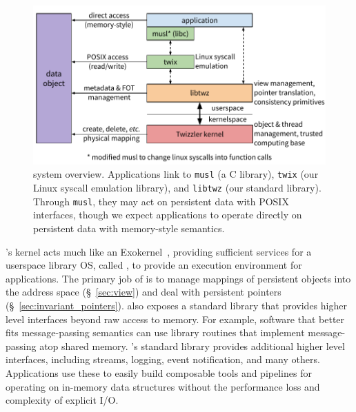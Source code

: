 {    \begin{figure}
        \centering
        \includegraphics[width=\textwidth]{fig/sys_diag}
        \caption{\Twizzler system overview. Applications link to \texttt{musl} (a C library),
            \texttt{twix} (our Linux syscall emulation library), and \texttt{libtwz} (our standard
            library). Through \texttt{musl}, they may act on persistent data with POSIX interfaces,
            though we expect \Twizzler applications to operate directly on persistent data with
            memory-style semantics.}
        \label{fig:twz_sys_overview}
    \end{figure}


    \Twizzler's kernel acts much like an
    Exokernel~\cite{Kaashoek,engler:sosp95}, providing sufficient services for a
    userspace library OS, called \emph{\libcore}, to provide an execution environment for applications.
    The primary job of \libcore is to manage mappings of persistent objects into the address space (\S~\ref{sec:view})
    and deal with persistent pointers (\S~\ref{sec:invariant_pointers}).
    \Twizzler also exposes a standard library that
    provides higher level interfaces beyond raw access to memory. For example, software that better fits
    message-passing semantics can use library routines that implement message-passing atop shared
    memory. \Twizzler's standard library provides additional
    higher level interfaces, including streams, logging, event notification, and many
    others. Applications use these to easily build composable tools and pipelines for
    operating on in-memory data structures without the performance loss and complexity of explicit I/O\@.

}

